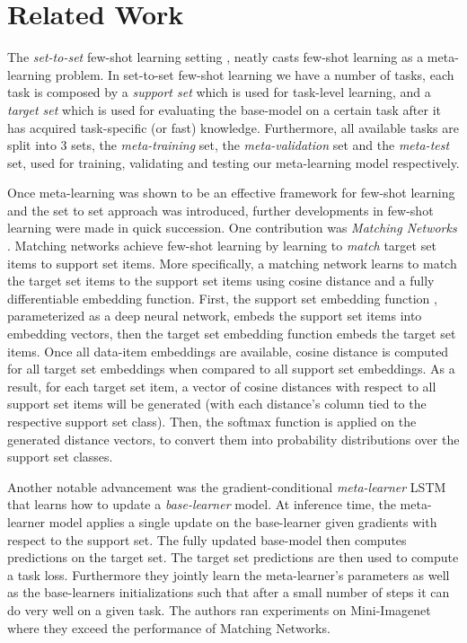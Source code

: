 \documentclass{article} \usepackage[dvipsnames]{xcolor}
\begin{document}
\section{Related Work}

The \emph{set-to-set} few-shot learning setting \citep{vinyals2016matching}, neatly casts few-shot learning as a meta-learning problem. In set-to-set few-shot learning we have a number of tasks, each task is composed by a \emph{support set} which is used for task-level learning, and a \emph{target set} which is used for evaluating the base-model on a certain task after it has acquired task-specific (or fast) knowledge. Furthermore, all available tasks are split into 3 sets, the \emph{meta-training} set, the \emph{meta-validation} set and the \emph{meta-test} set, used for training, validating and testing our meta-learning model respectively. 



Once meta-learning was shown to be an effective framework for few-shot learning and the set to set approach was introduced, further developments in few-shot learning were made in quick succession. One contribution was \emph{Matching Networks} \citep{vinyals2016matching}. Matching networks achieve few-shot learning by learning to \emph{match} target set items to support set items. More specifically, a matching network learns to match the target set items to the support set items using cosine distance and a fully differentiable embedding function.  First, the support set embedding function , parameterized as a deep neural network, embeds the support set items into embedding vectors, then the target set embedding function  embeds the target set items. Once all data-item embeddings are available, cosine distance is computed for all target set embeddings when compared to all support set embeddings. As a result, for each target set item, a vector of cosine distances with respect to all support set items will be generated (with each distance's column tied to the respective support set class). Then, the softmax function is applied on the generated distance vectors, to convert them into probability distributions over the support set classes. 

Another notable advancement was the gradient-conditional \emph{meta-learner} LSTM \citep{ravi2016optimization} that learns how to update a \emph{base-learner} model. At inference time, the meta-learner model applies a single update on the base-learner given gradients with respect to the support set. The fully updated base-model then computes predictions on the target set. The target set predictions are then used to compute a task loss. Furthermore they jointly learn the meta-learner's parameters as well as the base-learners initializations such that after a small number of steps it can do very well on a given task. The authors ran experiments on Mini-Imagenet where they exceed the performance of Matching Networks.
\end{document}
